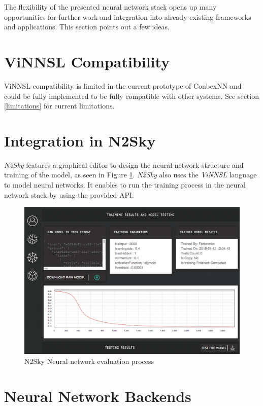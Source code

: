 The flexibility of the presented neural network stack opens up many
opportunities for further work and integration into already existing
frameworks and applications. This section points out a few ideas.

\section{ViNNSL Compatibility}\label{vinnsl-compatibility}

ViNNSL compatibility is limited in the current prototype of ConbexNN and
could be fully implemented to be fully compatible with other systems.
See section \ref{limitations} for current limitations.

\section{Integration in N2Sky}\label{integration-in-n2sky}

\emph{N2Sky} features a graphical editor to design the neural network
structure and training of the model, as seen in Figure \ref{n2sky_eval}.
\emph{N2Sky} also uses the \emph{ViNNSL} language to model neural
networks. It enables to run the training process in the neural network
stack by using the provided API.

\begin{figure}
\centering
\includegraphics[width=12.00000cm]{images/n2sky_eval}
\caption{N2Sky Neural network evaluation process \cite{n2sky-2}
\label{n2sky_eval}}
\end{figure}

\section{Neural Network Backends}\label{neural-network-backends}


